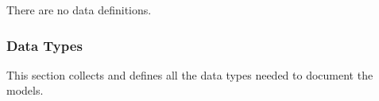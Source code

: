 \documentclass[12pt]{article}
\newcommand{\colAwidth}{0.13\textwidth}
\newcommand{\colBwidth}{0.82\textwidth}
\newcounter{defnum} %
\newcommand{\dref}[1]{GD\ref{#1}}
\newcounter{datadefnum} %
\newcommand{\aref}[1]{A\ref{#1}}
\newcommand{\iref}[1]{IM\ref{#1}}
\begin{document}
There are no data definitions.


\subsubsection{Data Types}\label{sec_datatypes}

This section collects and defines all the data types needed to document the
models.

~\newline
\end{document}
